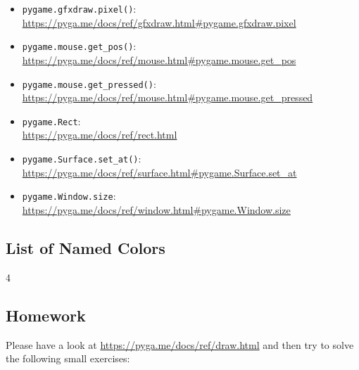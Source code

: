 \begin{pygbox}
\begin{itemize}
	\item \texttt{pygame.gfxdraw.pixel()}:
	\\ \url{https://pyga.me/docs/ref/gfxdraw.html#pygame.gfxdraw.pixel}
	
	\item \texttt{pygame.mouse.get\_pos()}:
	\\
	\url{https://pyga.me/docs/ref/mouse.html#pygame.mouse.get_pos}
	
	\item \texttt{pygame.mouse.get\_pressed()}:
	\\
	\url{https://pyga.me/docs/ref/mouse.html#pygame.mouse.get_pressed}
	
	\item \texttt{pygame.Rect}:
	\\
	\url{https://pyga.me/docs/ref/rect.html}
	
	\item \texttt{pygame.Surface.set\_at()}:
	\\
	\url{https://pyga.me/docs/ref/surface.html#pygame.Surface.set_at}
	
	\item \texttt{pygame.Window.size}:
	\\
	\url{https://pyga.me/docs/ref/window.html#pygame.Window.size}
\end{itemize}
\end{pygbox}

\subsection{List of Named Colors}\label{secNamedColors}
\begin{multicols}{4}
	\raggedcolumns
	\small
	
\end{multicols}

\subsection{Homework}

Please have a look at \url{https://pyga.me/docs/ref/draw.html} and then try to solve the following small exercises: 

